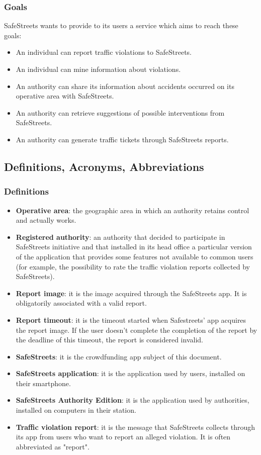\documentclass{article}
\newcommand\goal[1]{\item[{[G#1]}] }
\begin{document}
			\subsubsection{Goals}
				SafeStreets wants to provide to its users a service which aims to reach these goals:
				\begin{itemize}
					\goal{1}An individual can report traffic violations to SafeStreets.
					\goal{2}An individual can mine information about violations.					
					\goal{3}An authority can share its information about accidents occurred on its operative area with SafeStreets.
					\goal{4}An authority can retrieve suggestions of possible interventions from SafeStreets.
					\goal{5}An authority can generate traffic tickets through SafeStreets reports.
				\end{itemize}
				
				
		\subsection{Definitions, Acronyms, Abbreviations}
			\subsubsection{Definitions}
				\begin{itemize}
					\item \textbf{Operative area}: the geographic area in which an authority retains  control and actually works.
					\item \textbf{Registered authority}: an authority that decided to participate in SafeStreets initiative and that installed in its head office a particular version of the application that provides some features not available to common users (for example, the possibility to rate the traffic violation reports collected by SafeStreets).
					\item \textbf{Report image}: it is the image acquired through the SafeStreets app. It is obligatorily associated with a valid report.
					\item \textbf{Report timeout}: it is the timeout started when Safestreets' app acquires the report image. If the user doesn't complete the completion of the report by the deadline of this timeout, the report is considered invalid.
					\item \textbf{SafeStreets}: it is the crowdfunding app subject of this document.
					\item \textbf{SafeStreets application}: it is the application used by users, installed on their smartphone.
					\item \textbf{SafeStreets Authority Edition}: it is the application used by authorities, installed on computers in their station.
					\item \textbf{Traffic violation report}: it is the message that SafeStreets collects through its app from users who want to report an alleged violation. It is often abbreviated as "report".
				\end{itemize}
\end{document}
